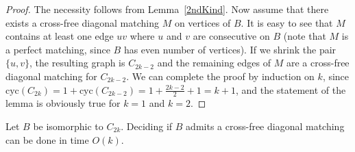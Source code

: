 \documentclass[10pt]{llncs}
\begin{document}
\begin{proof}
  The necessity follows from Lemma~\ref{2ndKind}.  Now assume that
  there exists a cross-free diagonal matching $M$ on vertices of $B$.
  It is easy to see that $M$ contains at least one edge $uv$ where $u$
  and $v$ are consecutive on $B$ (note that $M$ is a perfect matching,
  since $B$ has even number of vertices). If we shrink the pair $\{u,
  v\}$, the resulting graph is $C_{2k-2}$ and the remaining edges of
  $M$ are a cross-free diagonal matching for $C_{2k-2}$.  We can
  complete the proof by induction on $k$, since $\text{cyc}(C_{2k}) =
  1 + \text{cyc}(C_{2k-2}) = 1 + \frac{2k-2}{2} + 1 = k + 1$, and the
  statement of the lemma is obviously true for $k = 1$ and $k=2$.
\end{proof}

\begin{lemma} \label{WhatKind}
  Let $B$ be isomorphic to $C_{2k}$. Deciding if $B$ admits a
  cross-free diagonal matching can be done in time $O(k)$.
\end{lemma}
\end{document}
